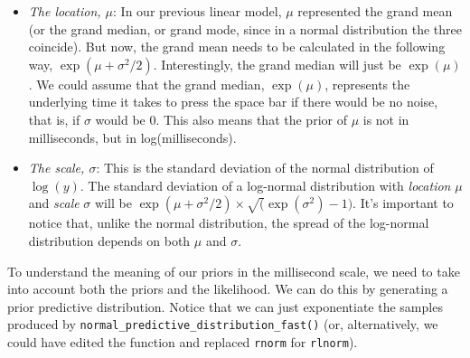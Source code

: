 \documentclass[12pt,]{krantz}
\newenvironment{Shaded}{\begin{snugshade}}{\end{snugshade}}
\newcommand{\KeywordTok}[1]{\textcolor[rgb]{0.13,0.29,0.53}{\textbf{#1}}}
\newcommand{\DataTypeTok}[1]{\textcolor[rgb]{0.13,0.29,0.53}{#1}}
\newcommand{\DecValTok}[1]{\textcolor[rgb]{0.00,0.00,0.81}{#1}}
\newcommand{\StringTok}[1]{\textcolor[rgb]{0.31,0.60,0.02}{#1}}
\newcommand{\OperatorTok}[1]{\textcolor[rgb]{0.81,0.36,0.00}{\textbf{#1}}}
\newcommand{\NormalTok}[1]{#1}
\providecommand{\tightlist}{%
  \setlength{\itemsep}{0pt}\setlength{\parskip}{0pt}}
\theoremstyle{definition}
\theoremstyle{definition}
\theoremstyle{definition}
\theoremstyle{remark}
\begin{document}
\begin{itemize}
\tightlist
\item
  \emph{The location, \(\mu\)}: In our previous linear model, \(\mu\)
  represented the grand mean (or the grand median, or grand mode, since
  in a normal distribution the three coincide). But now, the grand mean
  needs to be calculated in the following way,
  \(\exp(\mu +\sigma ^{2}/2)\). Interestingly, the grand median will
  just be \(\exp(\mu)\). We could assume that the grand median,
  \(\exp(\mu)\), represents the underlying time it takes to press the
  space bar if there would be no noise, that is, if \(\sigma\) would be
  0. This also means that the prior of \(\mu\) is not in milliseconds,
  but in log(milliseconds).
\item
  \emph{The scale, \(\sigma\)}: This is the standard deviation of the
  normal distribution of \(\log(y)\). The standard deviation of a
  log-normal distribution with \emph{location} \(\mu\) and \emph{scale}
  \(\sigma\) will be
  \(\exp(\mu +\sigma ^{2}/2)\times \sqrt(\exp(\sigma^2)- 1)\). It's
  important to notice that, unlike the normal distribution, the spread
  of the log-normal distribution depends on both \(\mu\) and \(\sigma\).
\end{itemize}

To understand the meaning of our priors in the millisecond scale, we
need to take into account both the priors and the likelihood. We can do
this by generating a prior predictive distribution. Notice that we can
just exponentiate the samples produced by
\texttt{normal\_predictive\_distribution\_fast()} (or, alternatively, we
could have edited the function and replaced \texttt{rnorm} for
\texttt{rlnorm}).

\begin{Shaded}
\end{Shaded}
\end{document}
